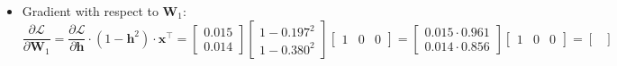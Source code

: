 \begin{notechapter}
\begin{itemize}
\[          \mathbf{W}_2 \cdot \frac{\partial \mathcal{L}}{\partial \mathbf{z}} =
          \begin{bmatrix}
          0.7 & 0.8 & 0.9 \\
          1.0 & 1.1 & 1.2
          \end{bmatrix}
          \begin{bmatrix}
          0.268 \\
          -0.673 \\
          0.405
          \end{bmatrix} =
          \begin{bmatrix}
          0.7 \cdot 0.268 + 0.8 \cdot (-0.673) + 0.9 \cdot 0.405 \\
          1.0 \cdot 0.268 + 1.1 \cdot (-0.673) + 1.2 \cdot 0.405
          \end{bmatrix} =
          \begin{bmatrix}
          0.188 - 0.538 + 0.365 \\
          0.268 - 0.740 + 0.486
          \end{bmatrix} =
          \begin{bmatrix}
          0.015 \\
          0.014
          \end{bmatrix}.
          \]
    \item Gradient with respect to \(\mathbf{W}_1\):
          \[
          \frac{\partial \mathcal{L}}{\partial \mathbf{W}_1} =
          \frac{\partial \mathcal{L}}{\partial \mathbf{h}} \cdot (1 - \mathbf{h}^2) \cdot \mathbf{x}^\top =
          \begin{bmatrix}
          0.015 \\
          0.014
          \end{bmatrix}
          \begin{bmatrix}
          1 - 0.197^2 \\
          1 - 0.380^2
          \end{bmatrix}
          \begin{bmatrix}
          1 & 0 & 0
          \end{bmatrix} =
          \begin{bmatrix}
          0.015 \cdot 0.961 \\
          0.014 \cdot 0.856
          \end{bmatrix}
          \begin{bmatrix}
          1 & 0 & 0
          \end{bmatrix} =
          \begin{bmatrix}

\end{bmatrix}\]
\end{itemize}
\end{notechapter}
